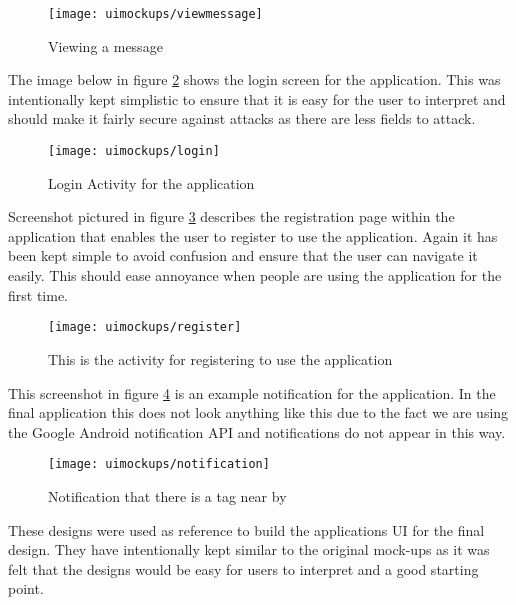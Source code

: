 \begin{figure}[H]
    \centering
    \texttt{[image: uimockups/viewmessage]}
    \caption{Viewing a message}
    \label{fig:viewing_message_image}
\end{figure} 

\noindent
The image below in figure \ref{fig:login_activity_image} shows the login screen for the application. This was intentionally kept simplistic to ensure that it is easy for the user to interpret and should make it fairly secure against attacks as there are less fields to attack.\\

\begin{figure}[H]
    \centering
    \texttt{[image: uimockups/login]}
    \caption{Login Activity for the application}
    \label{fig:login_activity_image}
\end{figure} 

\noindent
Screenshot pictured in figure \ref{fig:registration_activity_image} describes the registration page within the application that enables the user to register to use the application. Again it has been kept simple to avoid confusion and ensure that the user can navigate it easily. This should ease annoyance when people are using the application for the first time.\\

\begin{figure}[H]
    \centering
    \texttt{[image: uimockups/register]}
    \caption{This is the activity for registering to use the application}
    \label{fig:registration_activity_image}
\end{figure} 

\noindent
This screenshot in figure \ref{fig:notification_image} is an example notification for the application. In the final application this does not look anything like this due to the fact we are using the Google Android notification API and notifications do not appear in this way.\\

\begin{figure}[H]
    \centering
    \texttt{[image: uimockups/notification]}
    \caption{Notification that there is a tag near by}
    \label{fig:notification_image}
\end{figure} 

\noindent
These designs were used as reference to build the applications UI for the final design. They have intentionally kept similar to the original mock-ups as it was felt that the designs would be easy for users to interpret and a good starting point.

